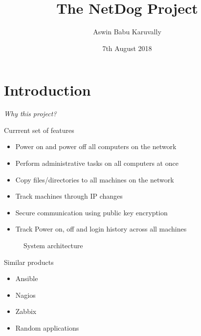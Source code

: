 \documentclass{beamer}
\title[Your Short Title]{The NetDog Project}
\author{Aswin Babu Karuvally}
\institute{College of Engineering Trivandrum}
\date{7th August 2018}
\begin{document}
\begin{frame}
    \titlepage
\end{frame}


\section{Introduction}

\begin{frame}
    \begin{center}
        \em Why this project?
    \end{center}
\end{frame}

\begin{frame}{Currrent set of features}
    \begin{itemize}
        \item<2-> Power on and power off all computers on the network
        \item<3-> Perform administrative tasks on all computers at once
        \item<4-> Copy files/directories to all machines on the network
        \item<5-> Track machines through IP changes
        \item<6-> Secure communication using public key encryption
        \item<7-> Track Power on, off and login history across all machines
    \end{itemize}
\end{frame}

\begin{figure}{System architecture}
\end{figure}


\begin{frame}{Similar products}
    \begin{itemize}
        \item<2-> Ansible
        \item<3-> Nagios
        \item<4-> Zabbix
        \item<5-> Random applications
    \end{itemize}
\end{frame}
\end{document}
